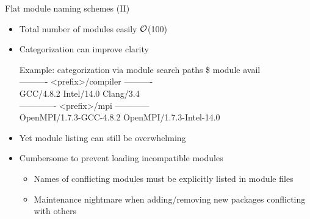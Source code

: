 \documentclass[10pt,xcolor={usenames,dvipsnames}]{beamer}
\begin{document}

\begin{frame}{Flat module naming schemes (II)}
\begin{itemize}
    \item
        Total number of modules easily $\cal{O}$(100)
    \item
        Categorization can improve clarity\\
        \enskip
        \begin{minipage}{0.9\textwidth}
            \begin{exampleblock}{\footnotesize Example: categorization via module search paths}
                \scriptsize
                \ttfamily
                \$ module avail\\
                ---------- <prefix>/compiler ----------\\
                GCC/4.8.2 \quad Intel/14.0 \quad Clang/3.4\\
                ------------- <prefix>/mpi ------------\\
                OpenMPI/1.7.3-GCC-4.8.2 \quad OpenMPI/1.7.3-Intel-14.0
            \end{exampleblock}
        \end{minipage}
    \smallskip
    \item
        Yet module listing can still be overwhelming
    \item
        Cumbersome to prevent loading incompatible modules
        \begin{itemize}
            \item
                Names of conflicting modules must be explicitly listed in module files
            \item
                Maintenance nightmare when adding/removing new packages
                conflicting with others
        \end{itemize}
\end{itemize}
\end{frame}

\end{document}

